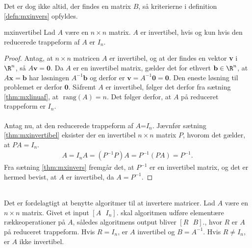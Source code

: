 %
%
Det er dog ikke altid, der findes en matrix $B$, så kriterierne i definition \ref{defn:mxinvers} opfyldes. 
%
\begin{thm}{}{mxinvertibel}
Lad $A$ være en $n \times n$ matrix. 
$A$ er invertibel, hvis og kun hvis den reducerede trappeform af $A$ er $I_n$.
\end{thm}
%
\begin{proof}
Antag, at $n\times n$ matricen $A$ er invertibel, og at der findes en vektor \textbf{v} i $\R^n$, så $A\textbf{v}=\textbf{0}$. 
Da $A$ er en invertibel matrix, gælder det for ethvert $\mathbf{b} \in \R^n$, at $A\textbf{x}=\mathbf{b}$ har løsningen $A^{-1}\mathbf{b}$ og derfor er $\textbf{v}=A^{-1}\textbf{0}=\textbf{0}$. 
Den eneste løsning til problemet er derfor $\textbf{0}$. 
Såfremt $A$ er invertibel, følger det derfor fra sætning \ref{thm:mxlinuaf}, at $\text{ rang}(A)=n$.
Det følger derfor, at $A$ på reduceret trappeform er $I_n$.
\\\\
Antag nu, at den reducerede trappeform af $A$=$I_n$. 
Jævnfør sætning \ref{thm:mxinvertibel} eksister der en invertibel $n \times n$ matrix $P$, hvorom det gælder, at $PA=I_n$. 
%
\begin{align*}
A=I_nA=(P^{-1}P)A=P^{-1}(PA)=P^{-1}.
\end{align*}
%
Fra sætning \ref{thm:mxinvers} fremgår det, at $P^{-1}$ er en invertibel matrix, og det er hermed bevist, at $A$ er invertibel, da $A=P^{-1}$.
\end{proof}
\\
Det er fordelagtigt at benytte algoritmer til at invertere matricer. Lad $A$ være en $n \times n$ matrix. 
Givet et input
$[A \text{   } I_n].
$
skal algoritmen udføre elementære rækkeoperationer på $A$, således algoritmens output bliver
$[R \text{   } B].
$,
hvor $R$ er $A$ på reduceret trappeform. 
Hvis $R=I_n$, er $A$ invertibel og $B=A^{-1}$.
Hvis $R \neq I_n$, er $A$ ikke invertibel. 
%
% 
\\
